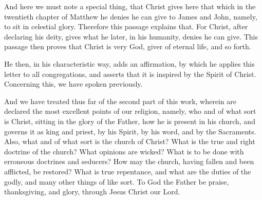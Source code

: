 And here we must note a special thing, that Christ gives here that which in the twentieth chapter of Matthew he denies he can give to James and John, namely, to sit in celestial glory. Therefore this passage explains that. For Christ, after declaring his deity, gives what he later, in his humanity, denies he can give. This passage then proves that Christ is very God, giver of eternal life, and so forth.

He then, in his characteristic way, adds an affirmation, by which he applies this letter to all congregations, and asserts that it is inspired by the Spirit of Christ. Concerning this, we have spoken previously.

And we have treated thus far of the second part of this work, wherein are declared the most excellent points of our religion, namely, who and of what sort is Christ, sitting in the glory of the Father, how he is present in his church, and governs it as king and priest, by his Spirit, by his word, and by the Sacraments. Also, what and of what sort is the church of Christ? What is the true and right doctrine of the church? What opinions are wicked? What is to be done with erroneous doctrines and seducers? How may the church, having fallen and been afflicted, be restored? What is true repentance, and what are the duties of the godly, and many other things of like sort. To God the Father be praise, thanksgiving, and glory, through Jesus Christ our Lord.
